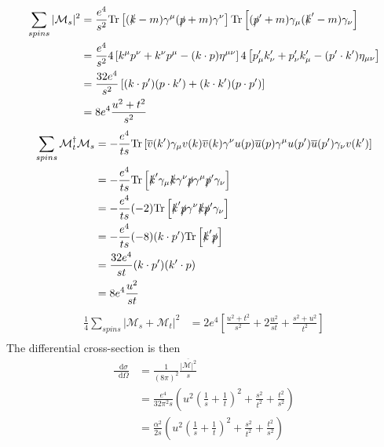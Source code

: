 \documentclass[12pt]{article}
\newcommand{\diff}{\mathop{}\!\mathrm{d}}
\newcommand{\tr}{\text{Tr}}
\theoremstyle{definition}
\begin{document}
\begin{equation*}
\begin{split}
    \sum_{spins} |\mathcal{M}_s|^2
        &= \frac{e^4}{s^2} \tr \left[ (\slashed{k} - m) \gamma^\mu (\slashed{p} + m) \gamma^\nu \right] \tr \left[ (\slashed{p}' + m) \gamma_\mu (\slashed{k}' - m) \gamma_\nu \right] \\
        &= \frac{e^4}{s^2} 4\left[ k^\mu p^\nu + k^\nu p^\mu - (k \cdot p)\eta^{\mu\nu} \right] 4\left[ p'_\mu k'_\nu + p'_\nu k'_\mu - (p' \cdot k')\eta_{\mu\nu} \right] \\
        &= \frac{32e^4}{s^2} \left[ (k \cdot p')(p \cdot k') + (k \cdot k')(p \cdot p') \right] \\
        &= 8e^4 \frac{u^2 + t^2}{s^2} \\
\end{split}
\end{equation*}
\begin{equation*}
\begin{split}
    \sum_{spins} \mathcal{M}_t^\dagger \mathcal{M}_s
        &= -\frac{e^4}{ts} \tr \left[ \overline{v}(k') \gamma_\mu v(k) \overline{v}(k) \gamma^\nu u(p) \overline{u}(p) \gamma^\mu u(p') \overline{u}(p') \gamma_\nu v(k') \right] \\
        &= -\frac{e^4}{ts} \tr \left[ \slashed{k}' \gamma_\mu \slashed{k} \gamma^\nu \slashed{p} \gamma^\mu \slashed{p}' \gamma_\nu \right] \\
        &= -\frac{e^4}{ts} (-2) \tr \left[ \slashed{k}' \slashed{p} \gamma^\nu \slashed{k} \slashed{p}' \gamma_\nu \right] \\
        &= -\frac{e^4}{ts} (-8) (k \cdot p') \tr \left[ \slashed{k}' \slashed{p} \right] \\
        &= \frac{32e^4}{st}(k \cdot p') (k' \cdot p) \\
        &= 8e^4 \frac{u^2}{st} \\
\end{split}
\end{equation*}
\begin{equation*}
\begin{split}
    \frac{1}{4} \sum_{spins} |\mathcal{M}_s + \mathcal{M}_t|^2
        &= 2e^4 \left[ \frac{u^2 + t^2}{s^2} + 2\frac{u^2}{st} + \frac{s^2 + u^2}{t^2} \right] \\
\end{split}
\end{equation*}
The differential cross-section is then
\begin{equation*}
\begin{split}
    \frac{\diff \sigma}{\diff \Omega} 
        &= \frac{1}{(8\pi)^2} \frac{\overline{|\mathcal{M}|^2}}{s} \\
        &= \frac{e^4}{32\pi^2 s} \left( u^2 \left( \frac{1}{s} + \frac{1}{t} \right)^2 + \frac{s^2}{t^2} + \frac{t^2}{s^2} \right) \\
        &= \frac{\alpha^2}{2s} \left( u^2 \left( \frac{1}{s} + \frac{1}{t} \right)^2 + \frac{s^2}{t^2} + \frac{t^2}{s^2} \right) \\
\end{split}
\end{equation*}
\end{document}
